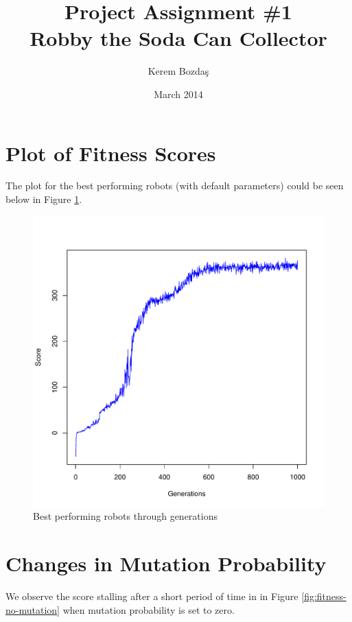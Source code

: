 \documentclass{article}
\title{\textbf{Project Assignment \#1} \\ Robby the Soda Can Collector}
\author{Kerem Bozdaş}
\date{March 2014}
\begin{document}
\maketitle

\section{Plot of Fitness Scores}
The plot for the best performing robots (with default parameters) could be seen below in Figure \ref{fig:fitness}.

\begin{figure}[h!]
\centering
\includegraphics[scale=0.56]{figure-1.pdf}
\caption{Best performing robots through generations}
\label{fig:fitness}
\end{figure}


\section{Changes in Mutation Probability}
We observe the score stalling after a short period of time in in Figure \ref{fig:fitness-no-mutation} when mutation probability is set to zero.
\end{document}
